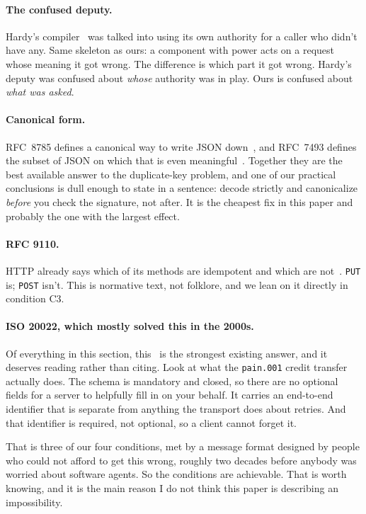 \documentclass[11pt]{article}
\begin{document}
\paragraph{The confused deputy.}
Hardy's compiler~\cite{hardy1988} was talked into using its own authority for
a caller who didn't have any. Same skeleton as ours: a component with power
acts on a request whose meaning it got wrong. The difference is which part it
got wrong. Hardy's deputy was confused about \emph{whose} authority was in
play. Ours is confused about \emph{what was asked}.

\paragraph{Canonical form.}
RFC~8785 defines a canonical way to write JSON down~\cite{rfc8785}, and
RFC~7493 defines the subset of JSON on which that is even
meaningful~\cite{rfc7493}. Together they are the best available answer to the
duplicate-key problem, and one of our practical conclusions is dull enough to
state in a sentence: decode strictly and canonicalize \emph{before} you check
the signature, not after. It is the cheapest fix in this paper and probably
the one with the largest effect.

\paragraph{RFC 9110.}
HTTP already says which of its methods are idempotent and which are
not~\cite{rfc9110}. \texttt{PUT} is; \texttt{POST} isn't. This is normative
text, not folklore, and we lean on it directly in condition C3.

\paragraph{ISO 20022, which mostly solved this in the 2000s.}
Of everything in this section, this~\cite{iso20022} is the strongest existing
answer, and it deserves reading rather than citing. Look at what the
\texttt{pain.001} credit transfer actually does. The schema is mandatory and
closed, so there are no optional fields for a server to helpfully fill in on
your behalf. It carries an end-to-end identifier that is separate from
anything the transport does about retries. And that identifier is required,
not optional, so a client cannot forget it.

That is three of our four conditions, met by a message format designed by
people who could not afford to get this wrong, roughly two decades before
anybody was worried about software agents. So the conditions are achievable.
That is worth knowing, and it is the main reason I do not think this paper is
describing an impossibility.
\end{document}
